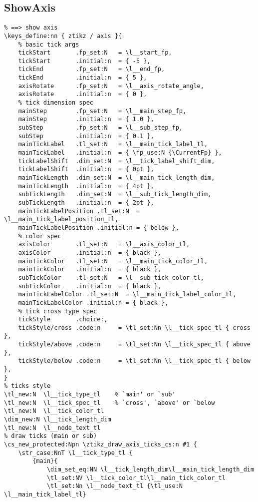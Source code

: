 \subsection{ShowAxis}
\begin{verbatim}
% ==> show axis
\keys_define:nn { ztikz / axis }{
    % basic tick args
    tickStart       .fp_set:N   = \l__start_fp,
    tickStart       .initial:n  = { -5 },
    tickEnd         .fp_set:N   = \l__end_fp,
    tickEnd         .initial:n  = { 5 },
    axisRotate      .fp_set:N   = \l__axis_rotate_angle,
    axisRotate      .initial:n  = { 0 },
    % tick dimension spec
    mainStep        .fp_set:N   = \l__main_step_fp,
    mainStep        .initial:n  = { 1.0 },
    subStep         .fp_set:N   = \l__sub_step_fp,
    subStep         .initial:n  = { 0.1 },
    mainTickLabel   .tl_set:N   = \l__main_tick_label_tl,
    mainTickLabel   .initial:n  = { \fp_use:N {\CurrentFp} },
    tickLabelShift  .dim_set:N  = \l__tick_label_shift_dim,
    tickLabelShift  .initial:n  = { 0pt },
    mainTickLength  .dim_set:N  = \l__main_tick_length_dim,
    mainTickLength  .initial:n  = { 4pt },
    subTickLength   .dim_set:N  = \l__sub_tick_length_dim,
    subTickLength   .initial:n  = { 2pt },
    mainTickLabelPosition .tl_set:N  = \l__main_tick_label_position_tl,
    mainTickLabelPosition .initial:n = { below },
    % color spec
    axisColor       .tl_set:N   = \l__axis_color_tl,
    axisColor       .initial:n  = { black },
    mainTickColor   .tl_set:N   = \l__main_tick_color_tl,
    mainTickColor   .initial:n  = { black },
    subTickColor    .tl_set:N   = \l__sub_tick_color_tl,
    subTickColor    .initial:n  = { black },
    mainTickLabelColor .tl_set:N  = \l__main_tick_label_color_tl,
    mainTickLabelColor .initial:n = { black },
    % tick cross type spec
    tickStyle       .choice:,
    tickStyle/cross .code:n     = \tl_set:Nn \l__tick_spec_tl { cross },
    tickStyle/above .code:n     = \tl_set:Nn \l__tick_spec_tl { above },
    tickStyle/below .code:n     = \tl_set:Nn \l__tick_spec_tl { below },
}
% ticks style
\tl_new:N  \l__tick_type_tl    % `main' or `sub'
\tl_new:N  \l__tick_spec_tl    % `cross', `above' or `below
\tl_new:N  \l__tick_color_tl 
\dim_new:N \l__tick_length_dim
\tl_new:N  \l__node_text_tl
% draw ticks (main or sub)
\cs_new_protected:Npn \ztikz_draw_axis_ticks_cs:n #1 {
    \str_case:NnT \l__tick_type_tl {
        {main}{
            \dim_set_eq:NN \l__tick_length_dim\l__main_tick_length_dim
            \tl_set:NV \l__tick_color_tl\l__main_tick_color_tl
            \tl_set:Nn \l__node_text_tl {\tl_use:N \l__main_tick_label_tl}

\end{verbatim}
